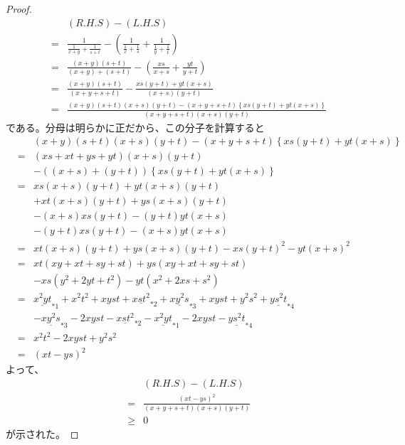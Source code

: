 \documentclass[12pt]{jsarticle}
\def\harmformula#1#2#3{\frac{#1}{\frac{1}{#2} + \frac{1}{#3}}}
\begin{document}
\begin{proof}
\begin{eqnarray}
&& (R.H.S) - (L.H.S) \nonumber \\
&=& \harmformula{1}{x + y}{s + t} -
\left( \harmformula{1}{x}{s} + \harmformula{1}{y}{t} \right) \\
&=& \frac{(x + y)(s + t)}{(x + y) + (s + t)}
- \left( \frac{x s}{x + s} + \frac{y t}{y + t} \right) \\
&=& \frac{(x + y)(s + t)}{(x + y + s + t)}
- \frac{x s (y + t) + y t (x + s)}{(x + s)(y + t)} \\
&=& \frac{(x+y)(s+t)(x+s)(y+t) - (x+y+s+t)
\left\{ xs(y+t) + yt(x+s) \right\} }
{ (x + y + s + t)(x + s)(y + t) }
\end{eqnarray}
である。分母は明らかに正だから、この分子を計算すると
\begin{eqnarray}
&& (x+y)(s+t)(x+s)(y+t) - (x+y+s+t)\left\{ xs(y+t) + yt(x+s) \right\}
\nonumber \\
&=& (xs + xt + ys + yt)(x + s)(y + t) \nonumber \\
&& - ((x + s) + (y + t)) \left\{ xs(y + t) + yt(x + s) \right\} \\
&=& xs(x + s)(y + t) + yt(x + s)(y + t) \nonumber \\
&& + xt(x + s)(y + t) + ys(x + s)(y +t) \nonumber \\
&& - (x + s)xs(y + t) - (y + t)yt(x + s) \nonumber \\
&& - (y + t)xs(y + t) - (x + s)yt(x + s) \\
&=& x t (x + s)(y + t) + y s (x + s)(y + t) - xs(y+t)^2 - yt(x+s)^2 \\
&=& xt(xy + xt + sy + st) + ys(xy + xt + sy + st) \nonumber \\
&& - xs(y^2 + 2yt + t^2) - yt(x^2 + 2xs +s^2) \\
&=& \underline{x^2yt}_{*1} + x^2t^2 + xyst + \underline{xst^2}_{*2}
+ \underline{xy^2s}_{*3} + xyst + y^2s^2 + \underline{ys^2t}_{*4} \nonumber \\
&& - \underline{xy^2s}_{*3} - 2xyst - \underline{xst^2}_{*2}
- \underline{x^2yt}_{*1} - 2xyst - \underline{ys^2t}_{*4} \\
&=& x^2t^2 - 2 xyst + y^2s^2 \\
&=& (xt - ys)^2
\end{eqnarray}
よって、
\begin{eqnarray}
&& (R.H.S) - (L.H.S) \nonumber \\
&=& \frac{(xt - ys)^2}{ (x + y + s + t)(x + s)(y +t) } \\
&\ge& 0
\end{eqnarray}
が示された。
\end{proof}
\end{document}
